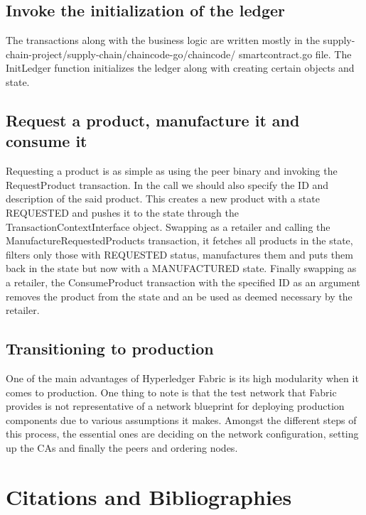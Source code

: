 \documentclass[sigconf,natbib=false]{acmart}
\begin{document}
    \subsection{Invoke the initialization of the ledger}
    The transactions along with the business logic are written mostly in the supply-chain-project/supply-chain/chaincode-go/chaincode/
    smartcontract.go file. The InitLedger function initializes the ledger along with creating certain objects and state.
    \subsection{Request a product, manufacture it and consume it}
    Requesting a product is as simple as using the peer binary and invoking the RequestProduct transaction. In the call we should also specify the ID and description of the said product. This creates a new product with a state REQUESTED and pushes it to the state through the TransactionContextInterface object. Swapping as a retailer and calling the ManufactureRequestedProducts transaction, it fetches all products in the state, filters only those with REQUESTED status, manufactures them and puts them back in the state but now with a MANUFACTURED state. Finally swapping as a retailer, the ConsumeProduct transaction with the specified ID as an argument removes the product from the state and an be used as deemed necessary by the retailer.
    \subsection{Transitioning to production}
    One of the main advantages of Hyperledger Fabric is its high modularity when it comes to production. One thing to note is that the test network that Fabric provides is not representative of a network blueprint for deploying production components due to various assumptions it makes.\cite{techtarget} Amongst the different steps of this process, the essential ones are deciding on the network configuration, setting up the CAs and finally the peers and ordering nodes.

    \section{Citations and Bibliographies}


%
%
    \printbibliography
\end{document}
